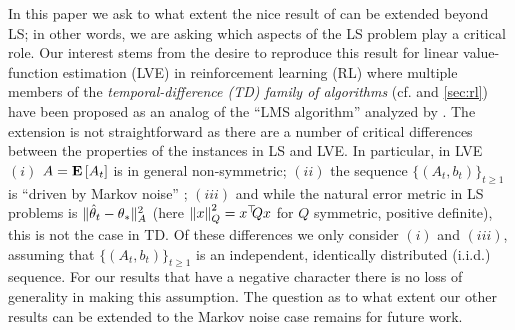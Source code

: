 In this paper we ask to what extent the nice result 
of \citeauthor{bach-moulines} can be extended beyond LS;
in other words, we are asking which aspects of the LS problem play a critical role. 
Our interest stems from the desire to reproduce this result for
linear value-function estimation (LVE) in reinforcement learning (RL) where
multiple members of the
\emph{temporal-difference (TD) family of algorithms} 
(cf. \cite{sutton,gtd,gtd2,gtdmp} and \cref{sec:rl})
have been proposed as an analog of the ``LMS algorithm'' analyzed by 
\citet{bach-moulines}.
The extension is not straightforward as there are a number of critical differences
between the properties of the instances in LS and LVE.
In particular,  in LVE
$(i)$  $A=\mathbf{E}\left[A_t\right]$ is in general non-symmetric;
$(ii)$ the sequence  $\{(A_t,b_t)\}_{t\ge 1}$ is ``driven by Markov noise'' \cite{tsivan97};
$(iii)$ and while the natural error metric in LS problems is $\| \hat{\theta}_t-\theta_*\|_{A}^2$
(here $\left\| x\right\|_Q^2 = x^\top\!\!Q x$ for $Q$ symmetric, positive definite), 
this is not the case in TD.
Of these differences we only consider $(i)$ and $(iii)$, assuming that $\{(A_t,b_t)\}_{t\ge 1}$ is an independent, identically distributed (i.i.d.) sequence. 
For our results that have a negative character there is no loss of generality in 
making this assumption. 
The question as to what extent our other results can be extended to the Markov noise
case remains for future work. 

\iffalse
\if0
In particular, the convergence rates can degrade, or they may depend on potentially unbounded problem dependent constants \cite{bach-moulines}. Diminishing stepsizes such as $\alpha_t=\frac{c_0}{t+c}$, with problem instance specific tuning of the constants $c>0,c_0>0$ have been used in practice \cite{gtd2,gtdmp,konda-tsitsiklis}. 
An alternate idea, which we call the constant stepsize averaged LSA (CALSA) is to run \eqref{eq:lsaintro} by choosing $\alpha_t=\alpha>0$ $\forall t> 0$ with some $\alpha>0$, and output the average $\thh_t\eqdef\frac{1}{t+1}\sum_{s=0}^t \theta_s$. Thus, in CALSA, $\theta_t$ is an internal variable and $\thh_t$ is the output of the algorithm. The idea is that the constant stepsize leads to faster forgetting of initial conditions, while the averaging on the top reduces noise. This idea goes back to  \citet{ruppert} and \citet{polyak-judisky} who proposed it in the context of stochastic approximation that LSA is a special case of.   
\fi

